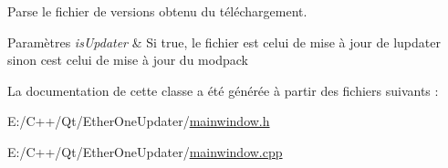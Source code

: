 Parse le fichier de versions obtenu du téléchargement. 


\begin{DoxyParams}{Paramètres}
{\em is\+Updater} & Si true, le fichier est celui de mise à jour de l\textquotesingle{}updater sinon c\textquotesingle{}est celui de mise à jour du modpack \\
\hline
\end{DoxyParams}


La documentation de cette classe a été générée à partir des fichiers suivants \+:\begin{DoxyCompactItemize}
\item 
E\+:/\+C++/\+Qt/\+Ether\+One\+Updater/\hyperlink{mainwindow_8h}{mainwindow.\+h}\item 
E\+:/\+C++/\+Qt/\+Ether\+One\+Updater/\hyperlink{mainwindow_8cpp}{mainwindow.\+cpp}\end{DoxyCompactItemize}
